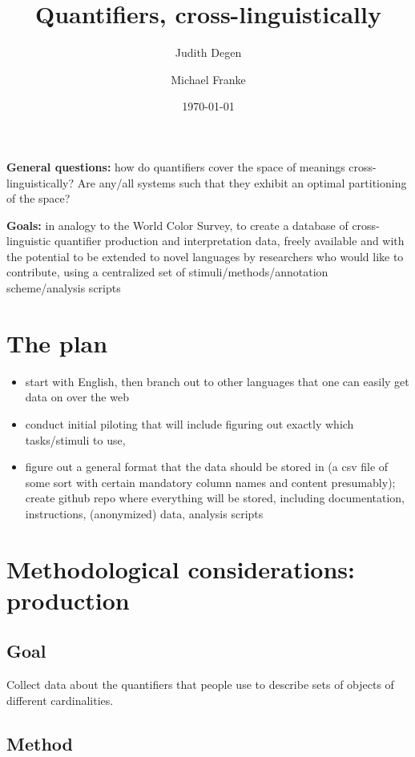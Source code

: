 \documentclass{article}
\title{Quantifiers, cross-linguistically}
\author{Judith Degen \and Michael Franke}
\date{\today}
\begin{document}
\maketitle



\textbf{General questions:} how do quantifiers cover the space of meanings cross-linguistically? Are any/all systems such that they exhibit an optimal partitioning of the space?

\textbf{Goals:} in analogy to the World Color Survey, to create a database of cross-linguistic quantifier production and interpretation data, freely available and with the potential to be extended to novel languages by researchers who would like to contribute, using a centralized set of stimuli/methods/annotation scheme/analysis scripts

\section{The plan}

\begin{itemize}
	\item start with English, then branch out to other languages that one can easily get data on over the web
	\item conduct initial piloting that will include figuring out exactly which tasks/stimuli to use, 
	\item figure out a general format that the data should be stored in (a csv file of some sort with certain mandatory column names and content presumably); create github repo where everything will be stored, including documentation, instructions, (anonymized) data, analysis scripts
\end{itemize}

\section{Methodological considerations: production}	

\subsection{Goal}

Collect data about the quantifiers that people use to describe sets of objects of different cardinalities.

\subsection{Method}
\end{document}
